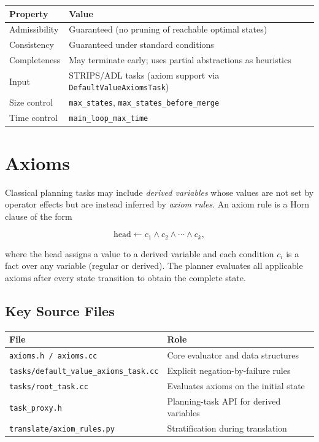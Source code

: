 \documentclass[11pt,a4paper]{article}
\begin{document}
\begin{center}
\begin{tabular}{ll}
\toprule
\textbf{Property} & \textbf{Value} \\
\midrule
Admissibility & Guaranteed (no pruning of reachable optimal states) \\
Consistency & Guaranteed under standard conditions \\
Completeness & May terminate early; uses partial abstractions as heuristics \\
Input & STRIPS/ADL tasks (axiom support via \texttt{DefaultValueAxiomsTask}) \\
Size control & \texttt{max\_states}, \texttt{max\_states\_before\_merge} \\
Time control & \texttt{main\_loop\_max\_time} \\
\bottomrule
\end{tabular}
\end{center}

\section{Axioms}

Classical planning tasks may include \emph{derived variables} whose values are
not set by operator effects but are instead inferred by \emph{axiom rules}.
An axiom rule is a Horn clause of the form

\[
  \text{head} \leftarrow c_1 \wedge c_2 \wedge \cdots \wedge c_k,
\]

where the head assigns a value to a derived variable and each condition $c_i$
is a fact over any variable (regular or derived).  The planner evaluates all
applicable axioms after every state transition to obtain the complete state.

\subsection{Key Source Files}

\begin{center}
\begin{tabular}{ll}
\toprule
\textbf{File} & \textbf{Role} \\
\midrule
\texttt{axioms.h / axioms.cc} & Core evaluator and data structures \\
\texttt{tasks/default\_value\_axioms\_task.cc} & Explicit negation-by-failure rules \\
\texttt{tasks/root\_task.cc} & Evaluates axioms on the initial state \\
\texttt{task\_proxy.h} & Planning-task API for derived variables \\
\texttt{translate/axiom\_rules.py} & Stratification during translation \\
\bottomrule
\end{tabular}
\end{center}
\end{document}
